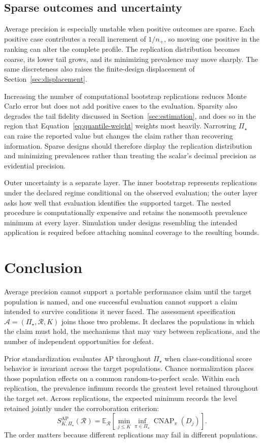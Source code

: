 \documentclass[11pt]{article}
\newcommand{\CNAP}{\operatorname{CNAP}}
\newcommand{\Regime}{\mathcal{R}}
\newcommand{\Assess}{\mathcal{A}}
\newcommand{\PSet}{\Pi_\star}
\newcommand{\E}{\mathbb{E}}
\newcommand{\SRob}{S_{K,\PSet}^{\mathrm{AP}}(\Regime)}
\theoremstyle{remark}
\begin{document}
\subsection{Sparse outcomes and uncertainty}

Average precision is especially unstable when positive outcomes are sparse. Each positive case contributes a recall increment of $1/n_+$, so moving one positive in the ranking can alter the complete profile. The replication distribution becomes coarse, its lower tail grows, and its minimizing prevalence may move sharply. The same discreteness also raises the finite-design displacement of Section~\ref{sec:displacement}.

Increasing the number of computational bootstrap replications reduces Monte Carlo error but does not add positive cases to the evaluation. Sparsity also degrades the tail fidelity discussed in Section~\ref{sec:estimation}, and does so in the region that Equation~\eqref{eq:quantile-weight} weights most heavily. Narrowing $\PSet$ can raise the reported value but changes the claim rather than recovering information. Sparse designs should therefore display the replication distribution and minimizing prevalences rather than treating the scalar's decimal precision as evidential precision.

Outer uncertainty is a separate layer. The inner bootstrap represents replications under the declared regime conditional on the observed evaluation; the outer layer asks how well that evaluation identifies the supported target. The nested procedure is computationally expensive and retains the nonsmooth prevalence minimum at every layer. Simulation under designs resembling the intended application is required before attaching nominal coverage to the resulting bounds.

\section{Conclusion}

Average precision cannot support a portable performance claim until the target population is named, and one successful evaluation cannot support a claim intended to survive conditions it never faced. The assessment specification $\Assess=(\PSet,\Regime,K)$ joins those two problems. It declares the populations in which the claim must hold, the mechanisms that may vary between replications, and the number of independent opportunities for defeat.

Prior standardization evaluates AP throughout $\PSet$ when class-conditional score behavior is invariant across the target populations. Chance normalization places those population effects on a common random-to-perfect scale. Within each replication, the prevalence infimum records the greatest level retained throughout the target set. Across replications, the expected minimum records the level retained jointly under the corroboration criterion:
\[
\SRob
=
\E_{\Regime}
\left[
\min_{j\leq K}
\inf_{\pi\in\PSet}\CNAP_\pi(D_j)
\right].
\]
The order matters because different replications may fail in different populations.
\end{document}
